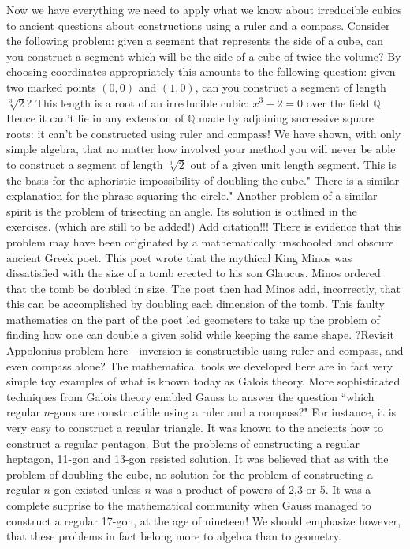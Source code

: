 Now we have everything we need to apply what we know about irreducible cubics to ancient questions about constructions using a ruler and a compass.
Consider the following problem: given a segment that represents the side of a cube, can you construct a segment which will be the side of a cube of twice the volume?
By choosing coordinates appropriately this amounts to the following question: given two marked points $(0,0)$ and $(1,0)$, can you construct a segment of length $\sqrt[3]{2}$? This length is a root of an irreducible cubic: $x^3-2=0$ over the field $\mathbb{Q}$. Hence it can't lie in any extension of $\mathbb{Q}$ made by adjoining successive square roots: it can't be constructed using ruler and compass! We have shown, with only simple algebra, that no matter how involved your method you will never be able to construct a segment of length $\sqrt[3]{2}$ out of a given unit length segment. This is the basis for the aphoristic impossibility of doubling the cube." There is a similar explanation for the phrase squaring the circle."
Another problem of a similar spirit is the problem of trisecting an angle. Its solution is outlined in the exercises. (which are still to be added!)
Add citation!!!
There is evidence that this problem may have been originated by a mathematically unschooled and obscure ancient Greek poet. This poet wrote that the mythical King Minos was dissatisfied with the size of a tomb erected to his son Glaucus. Minos ordered that the tomb be doubled in size. The poet then had Minos add, incorrectly, that this can be accomplished by doubling each dimension of the tomb. This faulty mathematics on the part of the poet led geometers to take up the problem of finding how one can double a given solid while keeping the same shape.
?Revisit Appolonius problem here - inversion is constructible using ruler and compass, and even compass alone?
The mathematical tools we developed here are in fact very simple toy examples of what is known today as Galois theory. More sophisticated techniques from Galois theory enabled Gauss to answer the question ``which regular $n$-gons are constructible using a ruler and a compass?" For instance, it is very easy to construct a regular triangle. It was known to the ancients how to construct a regular pentagon. But the problems of constructing a regular heptagon, 11-gon and 13-gon resisted solution. It was believed that as with the problem of doubling the cube, no solution for the problem of constructing a regular $n$-gon existed unless $n$ was a product of powers of 2,3 or 5. It was a complete surprise to the mathematical community when Gauss managed to construct a regular 17-gon, at the age of nineteen!
We should emphasize however, that these problems in fact belong more to algebra than to geometry.